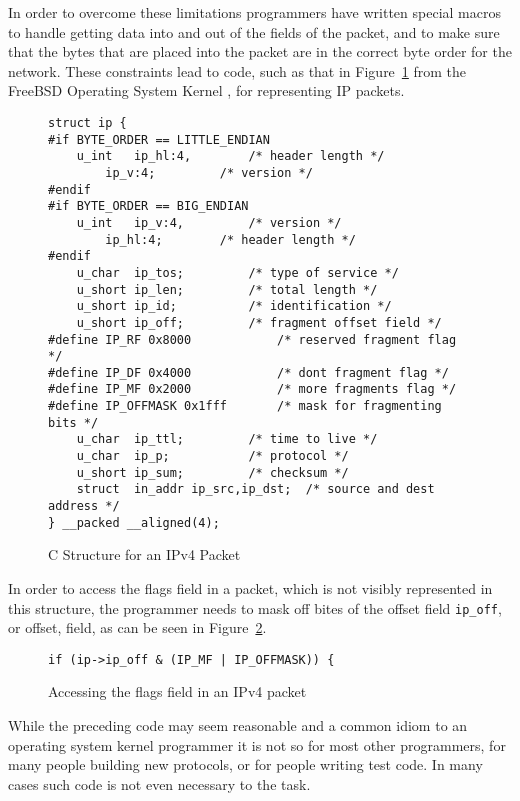 \documentclass{sig-alternate-10pt}
\begin{document}
In order to overcome these limitations programmers have written
special macros to handle getting data into and out of the fields of
the packet, and to make sure that the bytes that are placed into the
packet are in the correct byte order for the network.  These
constraints lead to code, such as that in
Figure~\ref{fig:c-structure-for-an-ipv4-packet} from the FreeBSD
Operating System Kernel \cite{mckusick:fbsd}, for representing IP
packets.

\begin{figure}
  \centering
\begin{verbatim}
struct ip {
#if BYTE_ORDER == LITTLE_ENDIAN
	u_int	ip_hl:4,		/* header length */
		ip_v:4;			/* version */
#endif
#if BYTE_ORDER == BIG_ENDIAN
	u_int	ip_v:4,			/* version */
		ip_hl:4;		/* header length */
#endif
	u_char	ip_tos;			/* type of service */
	u_short	ip_len;			/* total length */
	u_short	ip_id;			/* identification */
	u_short	ip_off;			/* fragment offset field */
#define	IP_RF 0x8000			/* reserved fragment flag */
#define	IP_DF 0x4000			/* dont fragment flag */
#define	IP_MF 0x2000			/* more fragments flag */
#define	IP_OFFMASK 0x1fff		/* mask for fragmenting bits */
	u_char	ip_ttl;			/* time to live */
	u_char	ip_p;			/* protocol */
	u_short	ip_sum;			/* checksum */
	struct	in_addr ip_src,ip_dst;	/* source and dest address */
} __packed __aligned(4);
\end{verbatim}
  \caption{C Structure for an IPv4 Packet}
  \label{fig:c-structure-for-an-ipv4-packet}
\end{figure}

In order to access the flags field in a packet, which is not visibly
represented in this structure, the programmer needs to mask off bites
of the offset field \verb|ip_off|, or offset, field, as can be seen in
Figure~\ref{fig:accessing-the-flags-field}.

\begin{figure}
  \centering
\begin{verbatim}
if (ip->ip_off & (IP_MF | IP_OFFMASK)) {  
\end{verbatim}
  \caption{Accessing the flags field in an IPv4 packet}
  \label{fig:accessing-the-flags-field}
\end{figure}

While the preceding code may seem reasonable and a common idiom to an
operating system kernel programmer it is not so for most other
programmers, for many people building new protocols, or for people
writing test code.  In many cases such code is not even necessary to
the task.
\end{document}

